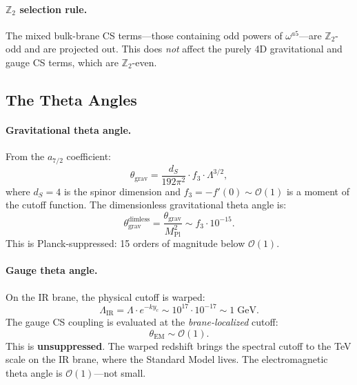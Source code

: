 \paragraph{$\mathbb{Z}_2$ selection rule.} The mixed bulk-brane CS terms---those containing odd powers of $\omega^{a5}$---are $\mathbb{Z}_2$-odd and are projected out. This does \emph{not} affect the purely 4D gravitational and gauge CS terms, which are $\mathbb{Z}_2$-even.


\subsection{The Theta Angles}
\label{sec:4-theta}

\paragraph{Gravitational theta angle.} From the $a_{7/2}$ coefficient:
\begin{equation}
  \theta_{\mathrm{grav}} = \frac{d_S}{192\pi^2} \cdot f_3 \cdot \Lambda^{3/2},
  \label{eq:4-42}
\end{equation}
where $d_S = 4$ is the spinor dimension and $f_3 = -f'(0) \sim \mathcal{O}(1)$ is a moment of the cutoff function. The dimensionless gravitational theta angle is:
\begin{equation}
  \theta_{\mathrm{grav}}^{\mathrm{dimless}} = \frac{\theta_{\mathrm{grav}}}{M_{\mathrm{Pl}}^2}
  \sim f_3 \cdot 10^{-15}.
  \label{eq:4-43}
\end{equation}
This is Planck-suppressed: 15 orders of magnitude below $\mathcal{O}(1)$.

\paragraph{Gauge theta angle.} On the IR brane, the physical cutoff is warped:
\begin{equation}
  \Lambda_{\mathrm{IR}} = \Lambda \cdot e^{-ky_c}
  \sim 10^{17} \cdot 10^{-17} \sim 1\;\mathrm{GeV}.
  \label{eq:4-44}
\end{equation}
The gauge CS coupling is evaluated at the \emph{brane-localized} cutoff:
\begin{equation}
  \theta_{\mathrm{EM}} \sim \mathcal{O}(1).
  \label{eq:4-45}
\end{equation}
This is \textbf{unsuppressed}. The warped redshift brings the spectral cutoff to the TeV scale on the IR brane, where the Standard Model lives. The electromagnetic theta angle is $\mathcal{O}(1)$---not small.

